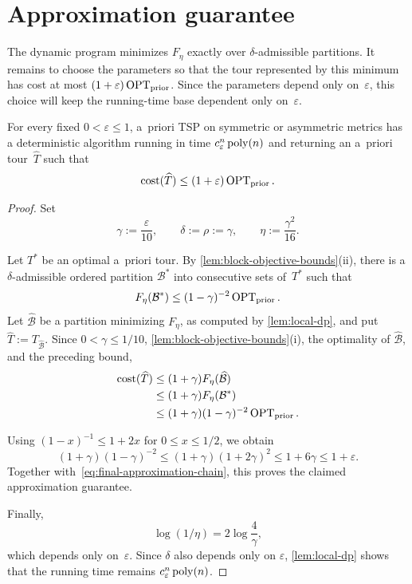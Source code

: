 \documentclass[12pt,a4paper,oneside]{report}
\begin{document}
\section{Approximation guarantee}\label{sec:dp-approximation}

The dynamic program minimizes $F_\eta$ exactly over $\delta$-admissible partitions.
It remains to choose the parameters so that the tour represented by this
minimum has cost at most $(1+\varepsilon)\operatorname{OPT}_\mathrm{prior}$.  Since the parameters
depend only on~$\varepsilon$, this choice will keep the running-time base
dependent only on~$\varepsilon$.

\begin{theorem}\label{thm:apriori-ptas}
For every fixed $0<\varepsilon\le1$, a~priori TSP on symmetric or asymmetric
metrics has a deterministic algorithm running in time
$c_\varepsilon^n\operatorname{poly}(n)$ and returning an a~priori tour~$\widehat T$ such that
\[
    \operatorname{cost}(\widehat T)\le(1+\varepsilon)\operatorname{OPT}_\mathrm{prior}.
\]
\end{theorem}

\begin{proof}
Set
\[
    \gamma:=\frac{\varepsilon}{10},
    \qquad
    \delta:=\rho:=\gamma,
    \qquad
    \eta:=\frac{\gamma^2}{16}.
\]

Let $T^*$ be an optimal a~priori tour.  By
\cref{lem:block-objective-bounds}(ii), there is a $\delta$-admissible ordered partition
$\mathcal B^*$ into consecutive sets of~$T^*$ such that
\[
    F_\eta(\mathcal B^*)
    \le(1-\gamma)^{-2}\operatorname{OPT}_\mathrm{prior}.
\]
Let $\widehat{\mathcal B}$ be a partition minimizing $F_\eta$, as computed by
\cref{lem:local-dp}, and put
$\widehat T:=T_{\widehat{\mathcal B}}$.  Since $0<\gamma\le1/10$,
\cref{lem:block-objective-bounds}(i), the optimality of
$\widehat{\mathcal B}$, and the preceding bound,
\begin{equation}\label{eq:final-approximation-chain}
    \begin{aligned}
        \operatorname{cost}(\widehat T)
        &\le (1+\gamma)F_\eta(\widehat{\mathcal B})\\
        &\le (1+\gamma)F_\eta(\mathcal B^*)\\
        &\le (1+\gamma)(1-\gamma)^{-2}\operatorname{OPT}_\mathrm{prior}.
    \end{aligned}
\end{equation}

Using $(1-x)^{-1}\le1+2x$ for $0\le x\le1/2$, we obtain
\[
    (1+\gamma)(1-\gamma)^{-2}
    \le(1+\gamma)(1+2\gamma)^2
    \le1+6\gamma
    \le1+\varepsilon.
\]
Together with~\cref{eq:final-approximation-chain}, this proves the claimed
approximation guarantee.

Finally,
\[
    \log(1/\eta)
    =2\log\frac{4}{\gamma},
\]
which depends only on~$\varepsilon$.  Since $\delta$ also depends only on
$\varepsilon$, \cref{lem:local-dp} shows that
the running time remains $c_\varepsilon^n\operatorname{poly}(n)$.
\end{proof}
\end{document}
